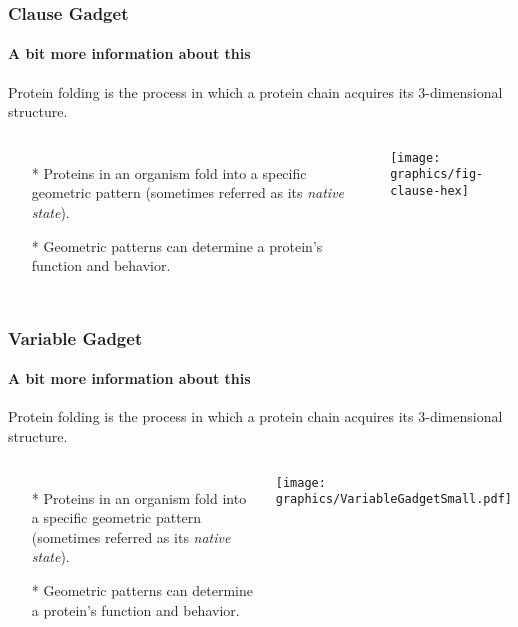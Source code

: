 \documentclass{beamer}
\begin{document}
  \begin{frame}
    \frametitle{Clause Gadget}
    \framesubtitle{A bit more information about this}
      Protein folding is the process in which a protein chain acquires its 3-dimensional structure.
    \begin{columns}[c] 
     \begin{itemize}
     	\item[*] Proteins in an organism fold into a specific geometric pattern (sometimes referred as its \textit{native state}).
     	\item[*] Geometric patterns can determine a protein's function and behavior. 
     \end{itemize}
	     \begin{minipage}{\linewidth}
			\begin{center}
			\texttt{[image: graphics/fig-clause-hex]}
			\label{fig:clause}
			\end{center}
		\end{minipage}
    \end{columns}
  \end{frame}

  \begin{frame}
    \frametitle{Variable Gadget}
    \framesubtitle{A bit more information about this}
      Protein folding is the process in which a protein chain acquires its 3-dimensional structure.
    \begin{columns}[c] %
     \begin{itemize}
     	\item[*] Proteins in an organism fold into a specific geometric pattern (sometimes referred as its \textit{native state}).
     	\item[*]  Geometric patterns can determine a protein's function and behavior. 
     \end{itemize}
	     \begin{minipage}{\linewidth}
		\begin{center}
		\texttt{[image: graphics/VariableGadgetSmall.pdf]}
		\label{fig:VariableGadgetSmall.pdf}
		\end{center}
		\end{minipage}
    \end{columns}
  \end{frame}
\end{document}

